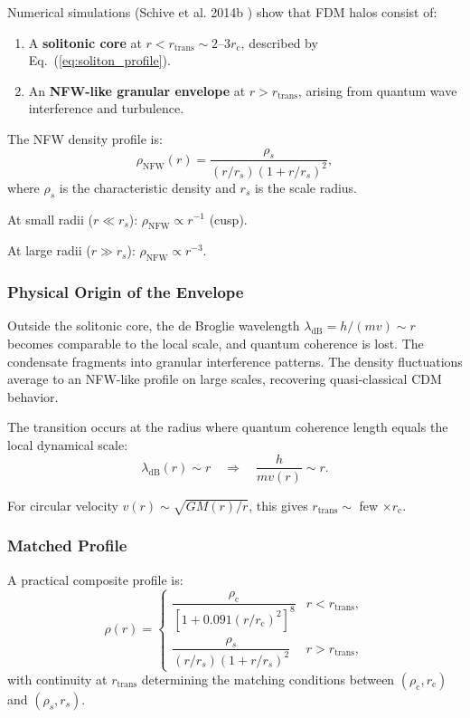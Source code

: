 \documentclass[11pt,a4paper]{article}
\newcommand{\rc}{\ensuremath{r_{\mathrm{c}}}}
\newcommand{\rhoc}{\ensuremath{\rho_{\mathrm{c}}}}
\newcommand{\lambdadB}{\ensuremath{\lambda_{\mathrm{dB}}}}
\theoremstyle{definition}
\theoremstyle{remark}
\begin{document}
Numerical simulations (Schive et al. 2014b \cite{Schive2014b}) show that FDM halos consist of:
\begin{enumerate}[leftmargin=*]
\item A \textbf{solitonic core} at $r < r_{\mathrm{trans}} \sim 2$--$3\rc$, described by Eq.~(\ref{eq:soliton_profile}).
\item An \textbf{NFW-like granular envelope} at $r > r_{\mathrm{trans}}$, arising from quantum wave interference and turbulence.
\end{enumerate}

The NFW density profile is:
\begin{equation}
\label{eq:nfw_profile}
\rho_{\mathrm{NFW}}(r) = \frac{\rho_s}{(r/r_s)(1 + r/r_s)^2},
\end{equation}
where $\rho_s$ is the characteristic density and $r_s$ is the scale radius.

At small radii ($r \ll r_s$): $\rho_{\mathrm{NFW}} \propto r^{-1}$ (cusp).

At large radii ($r \gg r_s$): $\rho_{\mathrm{NFW}} \propto r^{-3}$.

\subsubsection{Physical Origin of the Envelope}

Outside the solitonic core, the de Broglie wavelength $\lambdadB = h/(mv) \sim r$ becomes comparable to the local scale, and quantum coherence is lost. The condensate fragments into granular interference patterns. The density fluctuations average to an NFW-like profile on large scales, recovering quasi-classical CDM behavior.

The transition occurs at the radius where quantum coherence length equals the local dynamical scale:
\begin{equation}
\lambdadB(r) \sim r \quad \Rightarrow \quad \frac{h}{mv(r)} \sim r.
\end{equation}

For circular velocity $v(r) \sim \sqrt{GM(r)/r}$, this gives $r_{\mathrm{trans}} \sim$ few $\times \rc$.

\subsubsection{Matched Profile}

A practical composite profile is:
\begin{equation}
\rho(r) = \begin{cases}
\dfrac{\rhoc}{[1 + 0.091(r/\rc)^2]^8} & r < r_{\mathrm{trans}}, \\[1.2em]
\dfrac{\rho_s}{(r/r_s)(1 + r/r_s)^2} & r > r_{\mathrm{trans}},
\end{cases}
\end{equation}
with continuity at $r_{\mathrm{trans}}$ determining the matching conditions between $(\rhoc, \rc)$ and $(\rho_s, r_s)$.
\end{document}
